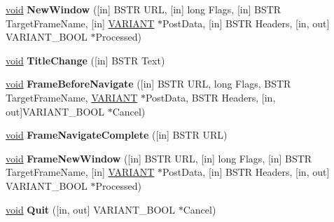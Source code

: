 \begin{DoxyCompactItemize}
\item 
\mbox{\label{interface_s_h_doc_vw_1_1uuid_aad757551e338287e4b699a3ab04a2774}} 
\hyperlink{interfacevoid}{void} {\bfseries New\+Window} (\mbox{[}in\mbox{]} B\+S\+TR U\+RL, \mbox{[}in\mbox{]} long Flags, \mbox{[}in\mbox{]} B\+S\+TR Target\+Frame\+Name, \mbox{[}in\mbox{]} \hyperlink{structtag_v_a_r_i_a_n_t}{V\+A\+R\+I\+A\+NT} $\ast$Post\+Data, \mbox{[}in\mbox{]} B\+S\+TR Headers, \mbox{[}in, out\mbox{]} V\+A\+R\+I\+A\+N\+T\+\_\+\+B\+O\+OL $\ast$Processed)
\item 
\mbox{\label{interface_s_h_doc_vw_1_1uuid_a0595f0d68fc3839b302ed0471842a3cf}} 
\hyperlink{interfacevoid}{void} {\bfseries Title\+Change} (\mbox{[}in\mbox{]} B\+S\+TR Text)
\item 
\mbox{\label{interface_s_h_doc_vw_1_1uuid_acfb5c5d33bb859f7e503c875f26b2c4d}} 
\hyperlink{interfacevoid}{void} {\bfseries Frame\+Before\+Navigate} (\mbox{[}in\mbox{]} B\+S\+TR U\+RL, long Flags, B\+S\+TR Target\+Frame\+Name, \hyperlink{structtag_v_a_r_i_a_n_t}{V\+A\+R\+I\+A\+NT} $\ast$Post\+Data, B\+S\+TR Headers, \mbox{[}in, out\mbox{]}V\+A\+R\+I\+A\+N\+T\+\_\+\+B\+O\+OL $\ast$Cancel)
\item 
\mbox{\label{interface_s_h_doc_vw_1_1uuid_addc63fc5166249414895c9fd7ceb686a}} 
\hyperlink{interfacevoid}{void} {\bfseries Frame\+Navigate\+Complete} (\mbox{[}in\mbox{]} B\+S\+TR U\+RL)
\item 
\mbox{\label{interface_s_h_doc_vw_1_1uuid_a921d20e40a8e4529b491493fbc97cbf1}} 
\hyperlink{interfacevoid}{void} {\bfseries Frame\+New\+Window} (\mbox{[}in\mbox{]} B\+S\+TR U\+RL, \mbox{[}in\mbox{]} long Flags, \mbox{[}in\mbox{]} B\+S\+TR Target\+Frame\+Name, \mbox{[}in\mbox{]} \hyperlink{structtag_v_a_r_i_a_n_t}{V\+A\+R\+I\+A\+NT} $\ast$Post\+Data, \mbox{[}in\mbox{]} B\+S\+TR Headers, \mbox{[}in, out\mbox{]} V\+A\+R\+I\+A\+N\+T\+\_\+\+B\+O\+OL $\ast$Processed)
\item 
\mbox{\label{interface_s_h_doc_vw_1_1uuid_a7de235b5422719ecab878177e631f63c}} 
\hyperlink{interfacevoid}{void} {\bfseries Quit} (\mbox{[}in, out\mbox{]} V\+A\+R\+I\+A\+N\+T\+\_\+\+B\+O\+OL $\ast$Cancel)

\end{DoxyCompactItemize}
